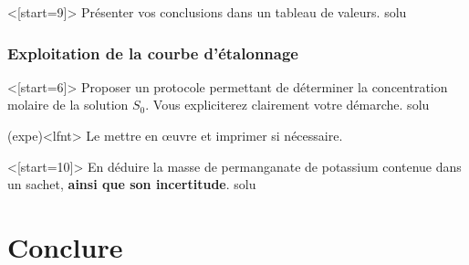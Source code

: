 \documentclass[../main/main.tex]{subfiles}
\begin{document}
\QR<[start=9]>{%
	Présenter vos conclusions dans un tableau de valeurs.
}{%
	solu
}

\subsubsection{Exploitation de la courbe d'étalonnage}

\QR<[start=6]>{%
	Proposer un protocole permettant de déterminer la concentration molaire de la
	solution $S_0$. Vous expliciterez clairement votre démarche.
}{%
	solu
}

\begin{tcb}(expe)<lfnt>{}
	Le mettre en œuvre et imprimer si nécessaire.
\end{tcb}

\QR<[start=10]>{%
	En déduire la masse de permanganate de potassium contenue dans un sachet,
	\textbf{ainsi que son incertitude}.
}{%
	solu
}


\section{Conclure}

\end{document}
